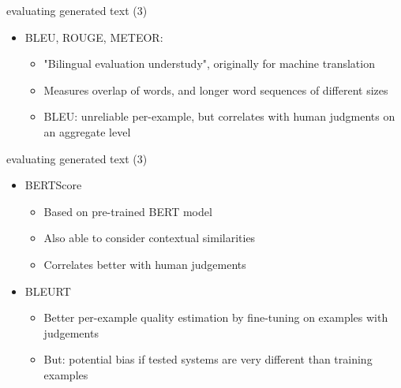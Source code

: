 
\begin{frame}{evaluating generated text (3)}

\vfill

\begin{itemize}
	\item BLEU, ROUGE, METEOR:
			\begin{itemize}
				\item "Bilingual evaluation understudy", originally for machine translation
				\item Measures overlap of words, and longer word sequences of different sizes
				\item BLEU: unreliable per-example, but correlates with human judgments on an aggregate level 
			\end{itemize}
\end{itemize}

\vfill

\end{frame}


\begin{frame}{evaluating generated text (3)}

\vfill

\begin{itemize}
	\item BERTScore
			\begin{itemize}
				\item Based on pre-trained BERT model
				\item Also able to consider contextual similarities
				\item Correlates better with human judgements
			\end{itemize}
	\item BLEURT
			\begin{itemize}
				\item Better per-example quality estimation by fine-tuning on examples with judgements
				\item But: potential bias if tested systems are very different than training examples
			\end{itemize}
\end{itemize}

\vfill

\end{frame}

